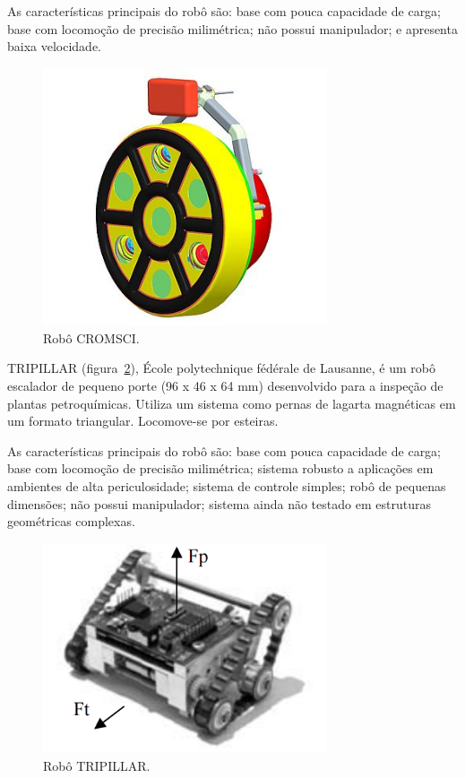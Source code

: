 As características principais do robô são: base com pouca capacidade de
carga; base com locomoção de precisão milimétrica; não possui manipulador; e
apresenta baixa velocidade.

\begin{figure}[ht]
\centering
\includegraphics[width=8.4cm]{sota/figs/climbers/cromsci.jpg}
\caption{Robô CROMSCI.}
\label{cromsci}
\end{figure}

TRIPILLAR (figura~\ref{tripillar}), École polytechnique fédérale de Lausanne, é
um robô escalador de pequeno porte (96 x 46 x 64 mm) desenvolvido para a inspeção de plantas
petroquímicas. Utiliza um sistema como pernas de lagarta magnéticas em um
formato triangular. Locomove-se por esteiras.

As características principais do robô são: base com pouca capacidade de
carga; base com locomoção de precisão milimétrica; sistema robusto a aplicações
em ambientes de alta periculosidade; sistema de controle simples; robô de
pequenas dimensões; não possui manipulador; sistema ainda não testado em estruturas geométricas complexas.


\begin{figure}[ht]
\centering
\includegraphics[width=8.4cm]{sota/figs/climbers/tripillar.png}
\caption{Robô TRIPILLAR.}
\label{tripillar}
\end{figure}
   
